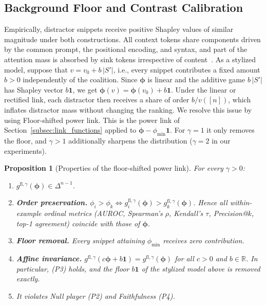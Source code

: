 \documentclass{article}
\newtheorem{proposition}{Proposition}
\begin{document}
\subsection{Background Floor and Contrast Calibration}
\label{subsec:contrast_calibration}

Empirically, distractor snippets receive positive Shapley values of similar magnitude under both constructions. All context tokens share components driven by the common prompt, the positional encoding, and syntax, and part of the attention mass is absorbed by sink tokens irrespective of content~\cite{xiao2024efficient}. As a stylized model, suppose that $v = v_0 + b\,|S'|$, i.e., every snippet contributes a fixed amount $b > 0$ independently of the coalition. Since $\boldsymbol{\phi}$ is linear and the additive game $b\,|S'|$ has Shapley vector $b\mathbf{1}$, we get $\boldsymbol{\phi}(v) = \boldsymbol{\phi}(v_0) + b\mathbf{1}$. Under the linear or rectified link, each distractor then receives a share of order $b / v([n])$, which inflates distractor mass without changing the ranking. We resolve this issue by using Floor-shifted power link. This is the power link of Section~\ref{subsec:link_functions} applied to $\boldsymbol{\phi} - \phi_{\min}\mathbf{1}$. For $\gamma = 1$ it only removes the floor, and $\gamma > 1$ additionally sharpens the distribution ($\gamma = 2$ in our experiments).

\begin{proposition}[Properties of the floor-shifted power link]\label{prop:rank_invariance}
For every $\gamma > 0$:
\begin{enumerate}
    \item[(i)] $g^{\text{fl},\gamma}(\boldsymbol{\phi}) \in \Delta^{n-1}$.
    \item[(ii)] \textbf{Order preservation.} $\phi_i > \phi_k \Leftrightarrow g^{\text{fl},\gamma}_i(\boldsymbol{\phi}) > g^{\text{fl},\gamma}_k(\boldsymbol{\phi})$. Hence all within-example ordinal metrics (AUROC, Spearman's $\rho$, Kendall's $\tau$, Precision@$k$, top-1 agreement) coincide with those of $\boldsymbol{\phi}$.
    \item[(iii)] \textbf{Floor removal.} Every snippet attaining $\phi_{\min}$ receives zero contribution.
    \item[(iv)] \textbf{Affine invariance.} $g^{\text{fl},\gamma}(c\boldsymbol{\phi} + b\mathbf{1}) = g^{\text{fl},\gamma}(\boldsymbol{\phi})$ for all $c > 0$ and $b \in \mathbb{R}$. In particular, (P3) holds, and the floor $b\mathbf{1}$ of the stylized model above is removed exactly.
    \item[(v)] It violates Null player (P2) and Faithfulness (P4).
\end{enumerate}
\end{proposition}
\end{document}
